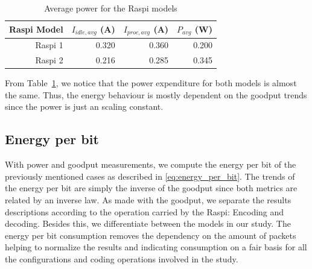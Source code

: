 \begin{table}[H]
\center
\caption{Average power for the \ac{Raspi} models}
\begin{tabular}{|r|r|r|r|}

\hline
\ac{Raspi} Model & $I_{idle,avg}$ (A)& $I_{proc,avg}$ (A) & $P_{avg}$ (W) \\
\hline
\hline
    \ac{Raspi} 1 &      0.320        &            0.360    & 0.200\\
\hline
    \ac{Raspi} 2 &      0.216        &            0.285    & 0.345\\
\hline
\end{tabular}
\vspace{0.2cm}
\label{tab:average_power_table}
\end{table}
%
From Table~\ref{tab:average_power_table}, we notice that the power expenditure
for both models is almost the same. Thus, the energy behaviour is mostly
dependent on the goodput trends since the power is just an scaling constant.
%
\subsection{Energy per bit}
With power and goodput measurements, we compute the energy per bit of
the previously mentioned cases as described in \eqref{eq:energy_per_bit}.
The trends of the energy per bit are simply the inverse of the goodput since
both metrics are related by an inverse law. As made with the goodput, we
separate the results descriptions according to the operation carried by the
\ac{Raspi}: Encoding and decoding. Besides this, we differentiate between
the models in our study. The energy per bit consumption removes the dependency
on the amount of packets helping to normalize the results and indicating
consumption on a fair basis for all the configurations and coding operations
involved in the study. 

